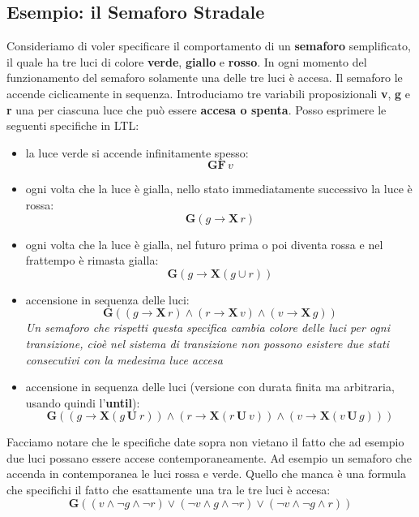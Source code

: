 \documentclass[a4paper,12pt, oneside]{book}
\begin{document}
\subsection{Esempio: il Semaforo Stradale}
Consideriamo di voler specificare il comportamento di un \textbf{semaforo}
semplificato, il quale ha tre luci di colore \textbf{verde}, \textbf{giallo} e
\textbf{rosso}. In ogni momento del funzionamento del semaforo solamente una
delle tre luci è accesa. Il semaforo le accende ciclicamente in
sequenza. Introduciamo tre variabili proposizionali \textbf{v},
\textbf{g} e \textbf{r} una  per ciascuna luce che può essere
\textbf{accesa o spenta}. Posso esprimere le seguenti specifiche in LTL:
\begin{itemize}
  \item la luce verde si accende infinitamente spesso:
  \[\mathbf{GF}\,v\]
  \item ogni volta che la luce è gialla, nello stato immediatamente successivo
  la luce è rossa:
  \[\mathbf{G}(g\rightarrow\mathbf{X}\,r)\]
  \item ogni volta che la luce è gialla, nel futuro prima o poi diventa rossa e
  nel frattempo è rimasta gialla:
  \[\mathbf{G}(g\rightarrow\mathbf{X}(g\cup r))\]
  \item accensione in sequenza delle luci:
  \[\mathbf{G}((g\rightarrow\mathbf{X}\,r)\land(r\rightarrow\mathbf{X}\,v)
    \land(v\rightarrow\mathbf{X}\,g))\]
  \textit{Un semaforo che rispetti questa specifica cambia colore delle luci per
    ogni transizione, cioè nel sistema di transizione non possono 
    esistere due stati consecutivi con la medesima luce accesa}
  \item accensione in sequenza delle luci (versione con durata finita ma
  arbitraria, usando quindi l'\textbf{until}):
  \[\mathbf{G}((g\rightarrow\mathbf{X}(g\,\mathbf{U}\ r))\land
    (r\rightarrow\mathbf{X}(r\,\mathbf{U}\
    v))\land(v\rightarrow\mathbf{X}(v\,\mathbf{U}\, g)))\] 
\end{itemize}
Facciamo notare che le specifiche date sopra non vietano il fatto che ad esempio
due luci possano essere accese contemporaneamente. Ad esempio un semaforo che
accenda in contemporanea le luci rossa e verde. Quello che manca è una formula
che specifichi il fatto che esattamente una tra le tre luci è accesa:
\[\mathbf{G}((v\land \neg g\land\neg r)\lor(\neg v\land g\land \neg r)\lor(\neg
  v\land \neg g\land r))\]
\end{document}
